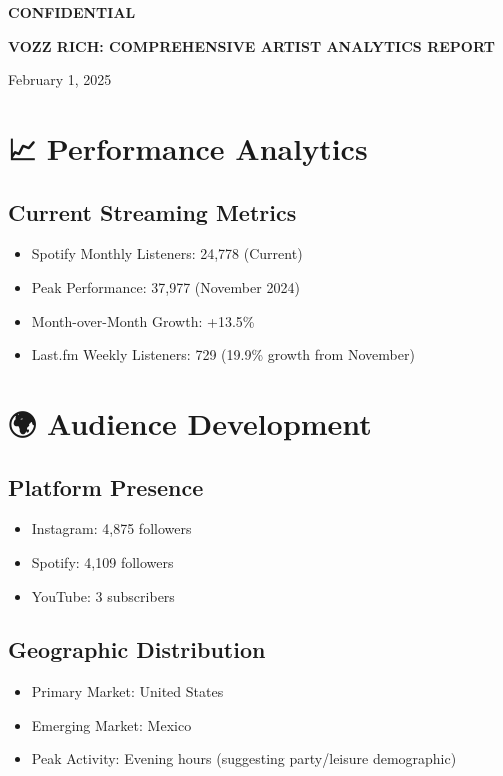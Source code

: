 \documentclass{article}
\begin{document}
\begin{center}
\textbf{CONFIDENTIAL}

\Large{\textbf{VOZZ RICH: COMPREHENSIVE ARTIST ANALYTICS REPORT}}
\normalsize

February 1, 2025
\end{center}

\section*{📈 Performance Analytics}

\subsection*{Current Streaming Metrics}
\begin{itemize}
\item Spotify Monthly Listeners: 24,778 (Current)
\item Peak Performance: 37,977 (November 2024)
\item Month-over-Month Growth: +13.5\%
\item Last.fm Weekly Listeners: 729 (19.9\% growth from November)
\end{itemize}

\section*{🌍 Audience Development}

\subsection*{Platform Presence}
\begin{itemize}
\item Instagram: 4,875 followers
\item Spotify: 4,109 followers
\item YouTube: 3 subscribers
\end{itemize}

\subsection*{Geographic Distribution}
\begin{itemize}
\item Primary Market: United States
\item Emerging Market: Mexico
\item Peak Activity: Evening hours (suggesting party/leisure demographic)
\end{itemize}
\end{document}
